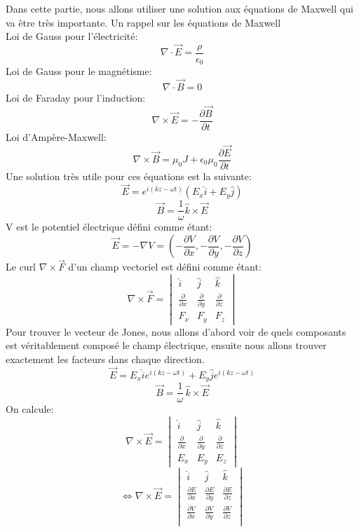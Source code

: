 \documentclass{article}
\begin{document}
\DeclarePairedDelimiter\bra{\langle}{\rvert}
\DeclarePairedDelimiter\ket{\lvert}{\rangle}
\DeclarePairedDelimiterX{}

Dans cette partie, nous allons utiliser une solution aux équations de Maxwell qui va être très
importante.
Un rappel sur les équations de Maxwell \\
Loi de Gauss pour l'électricité:
$$
\nabla \cdot \vec{E} = \frac{\rho}{\epsilon_0}
$$
Loi de Gauss pour le magnétisme:
$$
\nabla \cdot \vec{B} = 0
$$
Loi de Faraday pour l'induction:
$$
\nabla \times \vec{E} = -\frac{\partial\vec{B}}{\partial t}
$$
Loi d'Ampère-Maxwell:
$$
\nabla \times \vec{B} = \mu_0 J + \epsilon_0 \mu_0 \frac{\partial\vec{E}}{\partial t}
$$
Une solution très utile pour ces équations est la suivante:
$$
\vec{E} = e^{i(kz-\omega t)}(E_x \hat{i} + E_y \hat{j})
$$
$$
\vec{B} = \frac{1}{\omega} \hat{k} \times \vec{E}
$$
V est le potentiel électrique défini comme étant:
$$
\vec{E} = - \nabla V = (-\frac{\partial V}{\partial x},-\frac{\partial V}{\partial y},-\frac{\partial V}{\partial z})
$$
Le curl \( \nabla \times \vec{F} \) d'un champ vectoriel est défini comme étant:
$$
\nabla \times \vec{F} = 
\begin{vmatrix}
	\hat{i} & \hat{j} & \hat{k} \\
	\frac{\partial}{\partial x} & \frac{\partial}{\partial y} & \frac{\partial}{\partial z} \\
	F_x & F_y & F_z
\end{vmatrix}
$$
Pour trouver le vecteur de Jones, nous allons d'abord voir de quels composants est véritablement composé le champ électrique, ensuite nous allons trouver exactement les facteurs dans chaque direction.
$$
\vec{E} = E_x \hat{i} e^{i(kz-\omega t)} + E_y \hat{j} e^{i(kz-\omega t)} 
$$
$$
\vec{B} = \frac{1}{\omega}\,\hat{k} \times \vec{E}
$$
On calcule:
$$
\nabla \times \vec{E} = 
\begin{vmatrix}
	\hat{i} & \hat{j} & \hat{k} \\
	\frac{\partial}{\partial x} & \frac{\partial}{\partial y} & \frac{\partial}{\partial z} \\
	E_x & E_y & E_z
\end{vmatrix}
$$
$$
\iff \nabla \times \vec{E} =
\begin{vmatrix}
	\hat{i} & \hat{j} & \hat{k} \\
	\frac{\partial E}{\partial x} & \frac{\partial E}{\partial y} & \frac{\partial E}{\partial z} \\
	\frac{\partial V}{\partial x} & \frac{\partial V}{\partial y} & \frac{\partial V}{\partial z} \\
\end{vmatrix}
$$
\end{document}
